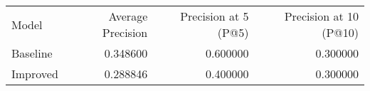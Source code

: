 \begin{tabular}{lrrr}
Model & Average Precision & Precision at 5 (P@5) & Precision at 10 (P@10) \\
Baseline & 0.348600 & 0.600000 & 0.300000 \\
Improved & 0.288846 & 0.400000 & 0.300000 \\
\end{tabular}
